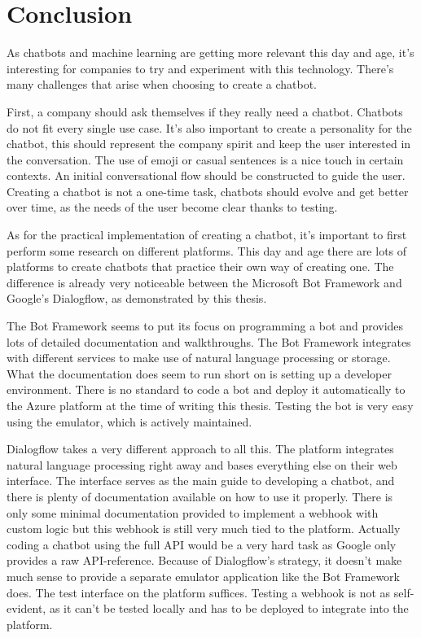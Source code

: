 \chapter*{Conclusion}

As chatbots and machine learning are getting more relevant this day and age, it's interesting for companies to try and experiment with this technology. There's many challenges that arise when choosing to create a chatbot.

First, a company should ask themselves if they really need a chatbot. Chatbots do not fit every single use case. It's also important to create a personality for the chatbot, this should represent the company spirit and keep the user interested in the conversation. The use of emoji or casual sentences is a nice touch in certain contexts. An initial conversational flow should be constructed to guide the user. Creating a chatbot is not a one-time task, chatbots should evolve and get better over time, as the needs of the user become clear thanks to testing.

As for the practical implementation of creating a chatbot, it's important to first perform some research on different platforms. This day and age there are lots of platforms to create chatbots that practice their own way of creating one. The difference is already very noticeable between the Microsoft Bot Framework and Google's Dialogflow, as demonstrated by this thesis.

The Bot Framework seems to put its focus on programming a bot and provides lots of detailed documentation and walkthroughs. The Bot Framework integrates with different services to make use of natural language processing or storage. What the documentation does seem to run short on is setting up a developer environment. There is no standard to code a bot and deploy it automatically to the Azure platform at the time of writing this thesis. Testing the bot is very easy using the emulator, which is actively maintained.

Dialogflow takes a very different approach to all this. The platform integrates natural language processing right away and bases everything else on their web interface. The interface serves as the main guide to developing a chatbot, and there is plenty of documentation available on how to use it properly. There is only some minimal documentation provided to implement a webhook with custom logic but this webhook is still very much tied to the platform. Actually coding a chatbot using the full API would be a very hard task as Google only provides a raw API-reference. Because of Dialogflow's strategy, it doesn't make much sense to provide a separate emulator application like the Bot Framework does. The test interface on the platform suffices. Testing a webhook is not as self-evident, as it can't be tested locally and has to be deployed to integrate into the platform.

